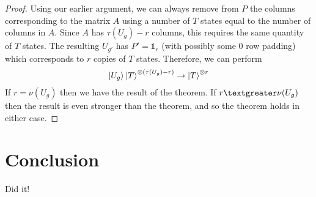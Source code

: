 \documentclass[12pt]{dalthesis}
\begin{document}
\begin{proof}
Using our earlier argument, we can always remove from $P$ the columns corresponding to the matrix $A$ using a number of $T$ states equal to the number of columns in $A$. Since $A$ has $\tau (U_g) - r$ columns, this requires the same quantity of $T$ states. The resulting $U_{g'}$ has $P' = \mathds{1}_r$ (with possibly some 0 row padding) which corresponds to $r$ copies of $T$ states. Therefore, we can perform 
\begin{equation}
\ket{U_g}\ket{T}^{\otimes (\tau (U_g) - r)} \rightarrow \ket{T}^{\otimes r}
\end{equation}
If $r = \nu (U_g)$ then we have the result of the theorem. If $r \textgreater \nu (U_g)$ then the result is even stronger than the theorem, and so the theorem holds in either case.
\end{proof}

\chapter{Conclusion}

Did it!



\end{document}
